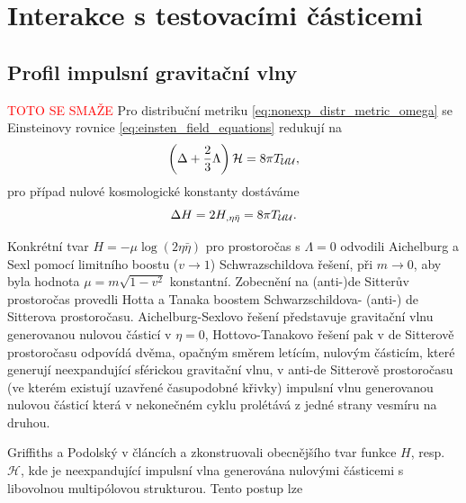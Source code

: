 \section{Interakce s testovacími částicemi}

\subsection{Profil impulsní gravitační vlny}



\textcolor{red}{TOTO SE SMAŽE}
Pro distribuční metriku \eqref{eq:nonexp_distr_metric_omega} se Einsteinovy rovnice \eqref{eq:einsten_field_equations} redukují na
\begin{equation}
    \label{eq:podminka_na_H_lambda_stare}
    \left(\Delta + \frac{2}{3} \Lambda \right)\mathcal{H} = 8 \pi T_{\mathcal{U} \mathcal{U}},
\end{equation}
pro případ nulové kosmologické konstanty dostáváme
\begin{equation}
    \label{eq:podminka_na_H_stare}
    \Delta H = 2 H_{,\eta \bar{\eta}} = 8 \pi T_{\mathcal{U} \mathcal{U}}.
\end{equation}

Konkrétní tvar $H=-\mu \log(2 \eta \bar{\eta})$ pro prostoročas s $\Lambda=0$ odvodili Aichelburg a Sexl \cite{Aichelburg_1971} pomocí limitního boostu ($v \to 1$)
Schwrazschildova řešení, při $m \to 0$, aby byla hodnota $\mu = m \sqrt{1-v^2}$ konstantní.
Zobecnění na (anti-)de Sitterův prostoročas provedli Hotta a Tanaka \cite{Hotta_1993} 
boostem Schwarzschildova- (anti-) de Sitterova prostoročasu. Aichelburg-Sexlovo řešení představuje gravitační vlnu generovanou
nulovou částicí v $\eta = 0$, Hottovo-Tanakovo řešení pak v de Sitterově prostoročasu odpovídá dvěma, opačným směrem letícím, nulovým částicím,
které generují neexpandující sférickou gravitační vlnu, v anti-de Sitterově prostoročasu (ve kterém existují uzavřené časupodobné křivky) impulsní vlnu generovanou nulovou částicí
která v nekonečném cyklu prolétává z jedné strany vesmíru na druhou.

Griffiths a Podolský v článcích \cite{Griffiths_1997} a \cite{Podolsky1997}
zkonstruovali obecnějšího tvar funkce $H$, resp. $\mathcal{H}$, kde je neexpandující impulsní vlna generována
nulovými částicemi s libovolnou multipólovou strukturou. Tento postup lze 

